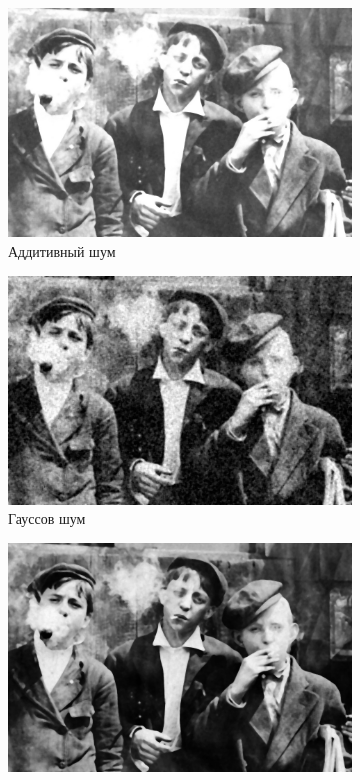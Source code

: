 \begin{figure}[ht]
\begin{subfigure}[b]{0.5\linewidth}
      \includegraphics[width=0.95\linewidth]{../Median_FIlter/Median_Additive_noise_(k=7).jpg} 
      \caption{Аддитивный шум} 
      \label{median_7:c} 
      \vspace{4ex}
    \end{subfigure}%
    \begin{subfigure}[b]{0.5\linewidth}
      \centering
      \includegraphics[width=0.95\linewidth]{../Median_FIlter/Median_Gaussian_noise_(k=7).jpg} 
      \caption{Гауссов шум} 
      \label{median_7:d} 
      \vspace{4ex}
    \end{subfigure}
    \begin{subfigure}[b]{0.5\linewidth}
      \centering
      \includegraphics[width=0.95\linewidth]{../Median_FIlter/Median_Poisson_noise_(k=7).jpg} 

\end{subfigure}
\end{figure}
